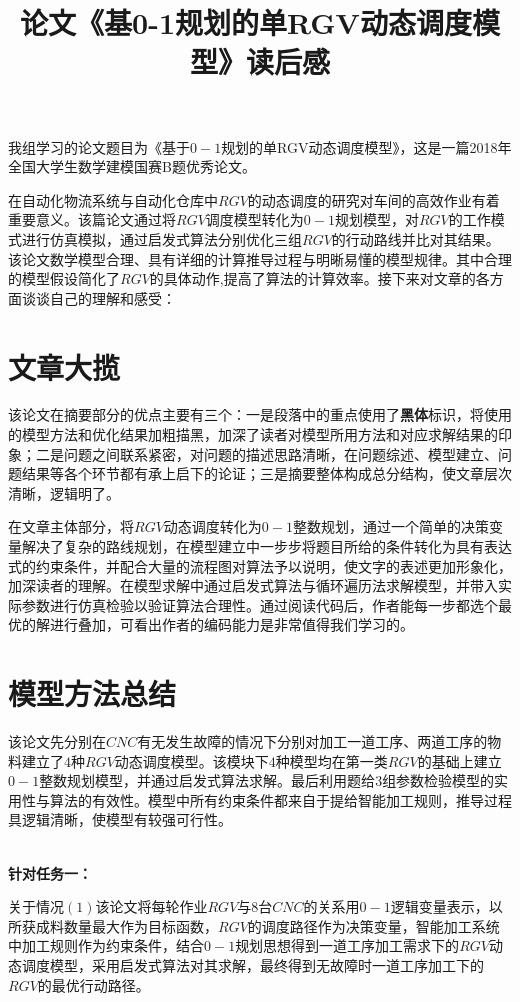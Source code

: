 \documentclass{whutmod}
\title{论文《基0-1规划的单RGV动态调度模型》读后感}
\begin{document}
	
	\maketitle
	\Large   
	我组学习的论文题目为《基于$0-1$规划的单RGV动态调度模型》，这是一篇2018年全国大学生数学建模国赛B题优秀论文。
	
	在自动化物流系统与自动化仓库中$RGV$的动态调度的研究对车间的高效作业有着重要意义。该篇论文通过将$RGV$调度模型转化为$0-1$规划模型，对$RGV$的工作模式进行仿真模拟，通过启发式算法分别优化三组$RGV$的行动路线并比对其结果。该论文数学模型合理、具有详细的计算推导过程与明晰易懂的模型规律。其中合理的模型假设简化了$RGV$的具体动作,提高了算法的计算效率。接下来对文章的各方面谈谈自己的理解和感受：
	
	\section{文章大揽}
	该论文在摘要部分的优点主要有三个：一是段落中的重点使用了\textbf{黑体}标识，将使用的模型方法和优化结果加粗描黑，加深了读者对模型所用方法和对应求解结果的印象；二是问题之间联系紧密，对问题的描述思路清晰，在问题综述、模型建立、问题结果等各个环节都有承上启下的论证；三是摘要整体构成总分结构，使文章层次清晰，逻辑明了。
	
	在文章主体部分，将$RGV$动态调度转化为$0-1$整数规划，通过一个简单的决策变量解决了复杂的路线规划，在模型建立中一步步将题目所给的条件转化为具有表达式的约束条件，并配合大量的流程图对算法予以说明，使文字的表述更加形象化，加深读者的理解。在模型求解中通过启发式算法与循环遍历法求解模型，并带入实际参数进行仿真检验以验证算法合理性。通过阅读代码后，作者能每一步都选个最优的解进行叠加，可看出作者的编码能力是非常值得我们学习的。
	
	
	\section{模型方法总结}
	该论文先分别在$CNC$有无发生故障的情况下分别对加工一道工序、两道工序的物料建立了$4$种$RGV$动态调度模型。该模块下$4$种模型均在第一类$RGV$的基础上建立$0-1$整数规划模型，并通过启发式算法求解。最后利用题给$3$组参数检验模型的实用性与算法的有效性。模型中所有约束条件都来自于提给智能加工规则，推导过程具逻辑清晰，使模型有较强可行性。

	~\\	
	\textbf{针对任务一：}
	
	关于情况$(1)$该论文将每轮作业$RGV$与$8$台$CNC$的关系用$0-1$逻辑变量表示，以所获成料数量最大作为目标函数，$RGV$的调度路径作为决策变量，智能加工系统中加工规则作为约束条件，结合$0-1$规划思想得到一道工序加工需求下的$RGV$动态调度模型，采用启发式算法对其求解，最终得到无故障时一道工序加工下的$RGV$的最优行动路径。
	
\end{document}
